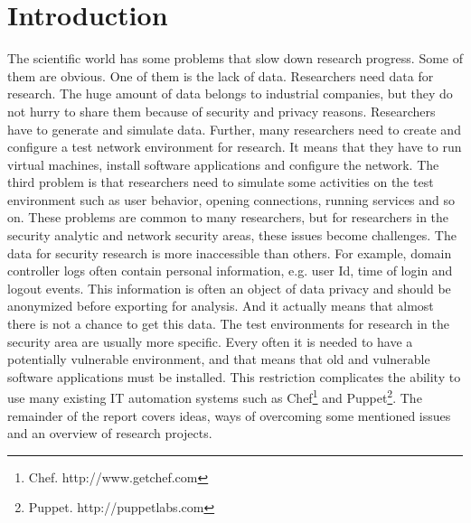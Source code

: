\section{Introduction}

The scientific world has some problems that slow down research progress. Some of them are obvious. One of them is the lack of data. Researchers need data for research. The huge amount of data belongs to industrial companies, but they do not hurry to share them because of security and privacy reasons. Researchers have to generate and simulate data. Further, many researchers need to create and configure a test network environment for research. It means that they have to run virtual machines, install software applications and configure the network. The third problem is that researchers need to simulate some activities on the test environment such as user behavior, opening connections, running services and so on. These problems are common to many researchers, but for researchers in the security analytic and network security areas, these issues become challenges. The data for security research is more inaccessible than others. For example, domain controller logs often contain personal information, e.g. user Id, time of login and logout events. This information is often an object of data privacy and should be anonymized before exporting for analysis. And it actually means that almost there is not a chance to get this data. The test environments for research in the security area are usually more specific. Every often it is needed to have a potentially vulnerable environment, and that means that old and vulnerable software applications must be installed. This restriction complicates the ability to use many existing IT automation systems such as Chef\footnote{Chef. http://www.getchef.com} and Puppet\footnote{Puppet. http://puppetlabs.com}. The remainder of the report covers ideas, ways of overcoming some mentioned issues and an overview of research projects.

